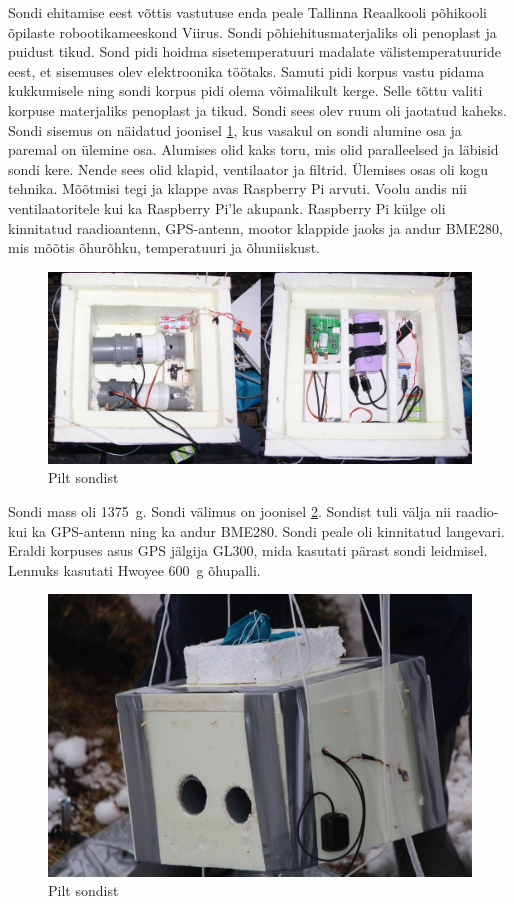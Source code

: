 \documentclass{trkut}%
\begin{document}
Sondi ehitamise eest võttis vastutuse enda peale Tallinna Reaalkooli põhikooli õpilaste robootikameeskond Viirus. Sondi põhiehitusmaterjaliks oli penoplast ja puidust tikud. Sond pidi hoidma sisetemperatuuri madalate välistemperatuuride eest, et sisemuses olev elektroonika töötaks. Samuti pidi korpus vastu pidama kukkumisele ning sondi korpus pidi olema võimalikult kerge. Selle tõttu valiti korpuse materjaliks penoplast ja tikud. Sondi sees olev ruum oli jaotatud kaheks. Sondi sisemus on näidatud joonisel \ref{sond1}, kus vasakul on sondi alumine osa ja paremal on ülemine osa. Alumises olid kaks toru, mis olid paralleelsed ja läbisid sondi kere. Nende sees olid klapid, ventilaator ja filtrid. Ülemises osas oli kogu tehnika. Mõõtmisi tegi ja klappe avas Raspberry Pi arvuti. Voolu andis nii ventilaatoritele kui ka Raspberry Pi'le akupank. Raspberry Pi külge oli kinnitatud raadioantenn, GPS-antenn, mootor klappide jaoks ja andur BME280, mis mõõtis õhurõhku, temperatuuri ja õhuniiskust.
\begin{figure}[h]
	\includegraphics[width=1\textwidth]{PicGra/sond2korrus.jpg}
	\caption{Pilt sondist}
	\label{sond1}
\end{figure}
Sondi mass oli \SI{1375}{g}. Sondi välimus on joonisel \ref{sond2}. Sondist tuli välja nii raadio- kui ka GPS-antenn ning ka andur BME280. Sondi peale oli kinnitatud langevari. Eraldi korpuses asus GPS jälgija GL300, mida kasutati pärast sondi leidmisel. Lennuks kasutati Hwoyee \SI{600}{g} õhupalli.
\begin{figure}[h]
	\includegraphics[width=1\textwidth]{PicGra/sond.jpg}
	\caption{Pilt sondist}
	\label{sond2}
\end{figure}
\end{document}
